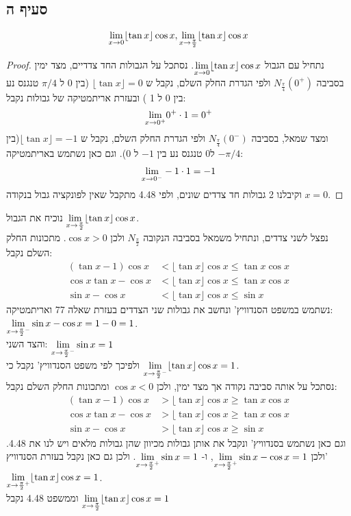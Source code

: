 \documentclass{article}
\begin{document}
	\pagebreak

	\subsection*{סעיף ה}
	\[
		\displaystyle{\lim_{x \to 0}} \lfloor \tan x \rfloor \cos x,
		\displaystyle{\lim_{x \to \frac{\pi}{2}}} \lfloor \tan x \rfloor \cos x
	\]
	\begin{proof}
		נתחיל עם הגבול $\displaystyle{\lim_{x \to 0}} \lfloor \tan x \rfloor \cos x$.
		נסתכל על הגבולות החד צדדיים, מצד ימין בסביבה $N_{\frac{\pi}{4}}(0^+)$ ולפי הגדרת החלק השלם, נקבל ש $\lfloor \tan x \rfloor = 0$ (בין 0 ל $\pi/4$ טנגנס נע בין 0 ל 1 )
		ובעזרת אריתמטיקה של גבולות נקבל:
		\begin{align*}
			\displaystyle{\lim_{x \to 0^+}} 0^+ \cdot 1 = 0^+
		\end{align*}
		ומצד שמאל, בסביבה $N_{\frac{\pi}{4}}(0^-)$ ולפי הגדרת החלק השלם, נקבל ש $\lfloor \tan x \rfloor = -1$(בין $-\pi/4$ ל$0$ טנגנס נע בין $-1$ ל $0$).
		וגם כאן נשתמש באריתמטיקה:
		\begin{align*}
			\displaystyle{\lim_{x \to 0^-}} -1 \cdot 1 = -1
		\end{align*}
		וקיבלנו 2 גבולות חד צדדים שונים, ולפי 4.48 מתקבל שאין לפונקציה גבול בנקודה ${x = 0}$.
	\end{proof}
	נוכיח את הגבול $\displaystyle{\lim_{x \to \frac{\pi}{2}}} \lfloor \tan x \rfloor \cos x$. \\
	 נפצל לשני צדדים, ונתחיל משמאל בסביבה הנקובה $N_{\frac{\pi}{2}}$ ולכן $\cos x > 0$.
	מתכונות החלק השלם נקבל:
	\begin{align*}
		(\tan x -1) \cos x &< \lfloor \tan x \rfloor \cos x \leq \tan x \cos x \\
		\cos x \tan x - \cos x &< \lfloor \tan x \rfloor \cos x \leq \tan x \cos x \\
		\sin x - \cos x &< \lfloor \tan x \rfloor \cos x \leq \sin x
	\end{align*}
	נשתמש במשפט הסנדוויץ' ונחשב את גבולות שני הצדדים בעזרת שאלה 77 ואריתמטיקה:
	$\displaystyle{\lim_{x \to \frac{\pi}{2}^-}}\sin x - \cos x = 1 - 0 = 1$. \\
	והצד השני:
	$\displaystyle{\lim_{x \to \frac{\pi}{2}^-}}\sin x = 1$ \\
	ולפיכך לפי משפט הסנדוויץ' נקבל כי $\displaystyle{\lim_{x \to \frac{\pi}{2}^-}} \lfloor \tan x \rfloor \cos x = 1$. \\

	נסתכל על אותה סביבה נקודה אך מצד ימין, ולכן $\cos x < 0$ ומתכונות החלק השלם נקבל:
	\begin{align*}
		(\tan x -1) \cos x &> \lfloor \tan x \rfloor \cos x \geq \tan x \cos x \\
		\cos x \tan x - \cos x &> \lfloor \tan x \rfloor \cos x \geq \tan x \cos x \\
		\sin x - \cos x &> \lfloor \tan x \rfloor \cos x \geq \sin x
	\end{align*}
	וגם כאן נשתמש בסנדוויץ' ונקבל את אותן גבולות מכיוון שהן גבולות מלאים ויש לנו את 4.48.
	ולכן $\displaystyle{\lim_{x \to \frac{\pi}{2}^+}}\sin x - \cos x = 1$, ו- $\displaystyle{\lim_{x \to \frac{\pi}{2}^+}}\sin x = 1$.
	ולכן גם כאן נקבל בעזרת הסנדוויץ' $\displaystyle{\lim_{x \to \frac{\pi}{2}^+}} \lfloor \tan x \rfloor \cos x = 1$. \\
	וממשפט 4.48 נקבל $\displaystyle{\lim_{x \to \frac{\pi}{2}}} \lfloor \tan x \rfloor \cos x = 1$
\end{document}
